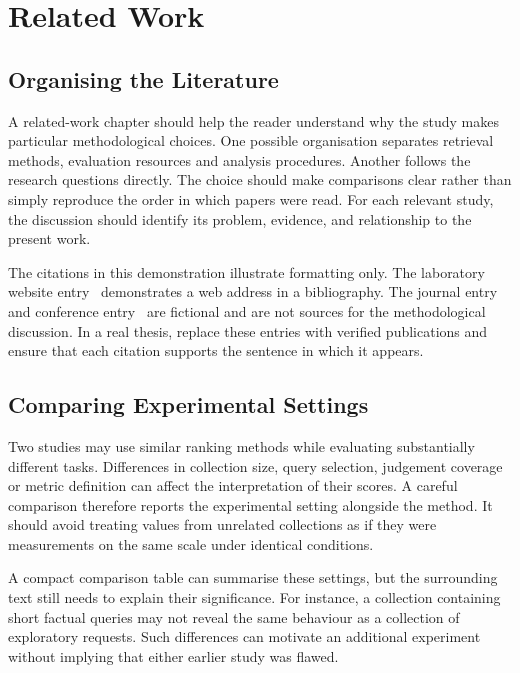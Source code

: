 \chapter{Related Work}
\label{sec:related_work}

\section{Organising the Literature}
A related-work chapter should help the reader understand why the study makes
particular methodological choices. One possible organisation separates
retrieval methods, evaluation resources and analysis procedures. Another
follows the research questions directly. The choice should make comparisons
clear rather than simply reproduce the order in which papers were read.
For each relevant study, the discussion should identify its problem, evidence,
and relationship to the present work.

The citations in this demonstration illustrate formatting only. The laboratory
website entry~\cite{RSL} demonstrates a web address in a bibliography. The journal
entry~\cite{exampleArticle} and conference entry~\cite{exampleConference} are
fictional and are not sources for the methodological discussion. In a real
thesis, replace these entries with verified publications and ensure that each
citation supports the sentence in which it appears.

\section{Comparing Experimental Settings}
Two studies may use similar ranking methods while evaluating substantially
different tasks. Differences in collection size, query selection, judgement
coverage or metric definition can affect the interpretation of their scores.
A careful comparison therefore reports the experimental setting alongside the
method. It should avoid treating values from unrelated collections as if they
were measurements on the same scale under identical conditions.

A compact comparison table can summarise these settings, but the surrounding
text still needs to explain their significance. For instance, a collection
containing short factual queries may not reveal the same behaviour as a
collection of exploratory requests. Such differences can motivate an
additional experiment without implying that either earlier study was flawed.

\newpage
